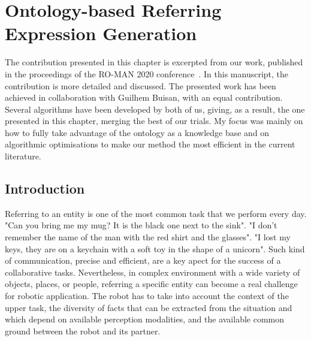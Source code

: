 \ifdefined{}
\else
\setcounter{chapter}{4} %
\dominitoc
\faketableofcontents
\fi

\chapter{Ontology-based Referring Expression Generation}
\minitoc

The contribution presented in this chapter is excerpted from our work, published in the proceedings of the RO-MAN 2020 conference~\cite{buisan_2020_efficient}. In this manuscript, the contribution is more detailed and discussed. The presented work has been achieved in collaboration with Guilhem Buisan, with an equal contribution. Several algorithms have been developed by both of us, giving, as a result, the one presented in this chapter, merging the best of our trials. My focus was mainly on how to fully take advantage of the ontology as a knowledge base and on algorithmic optimisations to make our method the most efficient in the current literature.

\section{Introduction}

Referring to an entity is one of the most common task that we perform every day. "Can you bring me my mug? It is the black one next to the sink". "I don't remember the name of the man with the red shirt and the glasses". "I lost my keys, they are on a keychain with a soft toy in the shape of a unicorn". Such kind of communication, precise and efficient, are a key apect for the success of a collaborative tasks. Nevertheless, in complex environment with a wide variety of objects, places, or people, referring a specific entity can become a real challenge for robotic application. The robot has to take into account the context of the upper task, the diversity of facts that can be extracted from the situation and which depend on available perception modalities, and the available common ground between the robot and its partner. 

